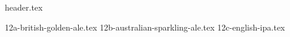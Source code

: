 \clearpage
{}
\divisorLine
{header.tex}
\begin{multicols*}{2}
{12a-british-golden-ale.tex}
{12b-australian-sparkling-ale.tex}
{12c-english-ipa.tex}
\end{multicols*}